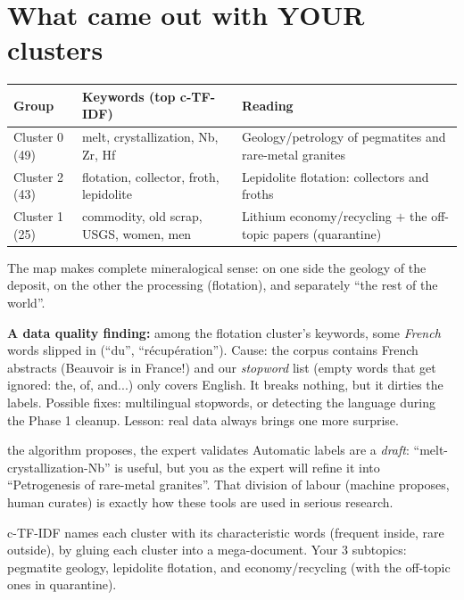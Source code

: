 \documentclass[11pt,a4paper]{article}
\begin{document}
\section{What came out with YOUR clusters}

\begin{center}
\begin{tabular}{lp{5.2cm}p{5.2cm}}
\textbf{Group} & \textbf{Keywords (top c-TF-IDF)} & \textbf{Reading} \\
\hline
Cluster 0 (49) & melt, crystallization, Nb, Zr, Hf & Geology/petrology of pegmatites and
rare-metal granites \\
Cluster 2 (43) & flotation, collector, froth, lepidolite & Lepidolite flotation:
collectors and froths \\
Cluster 1 (25) & commodity, old scrap, USGS, women, men & Lithium economy/recycling $+$ the
off-topic papers (quarantine) \\
\end{tabular}
\end{center}

The map makes complete mineralogical sense: on one side the geology of the deposit, on the
other the processing (flotation), and separately ``the rest of the world''.

\begin{ojo}
\textbf{A data quality finding:} among the flotation cluster's keywords, some \emph{French}
words slipped in (``du'', ``récupération''). Cause: the corpus contains French abstracts
(Beauvoir is in France!) and our \emph{stopword} list (empty words that get ignored: the, of,
and...) only covers English. It breaks nothing, but it dirties the labels. Possible fixes:
multilingual stopwords, or detecting the language during the Phase 1 cleanup. Lesson: real
data always brings one more surprise.
\end{ojo}

\begin{concepto}{the algorithm proposes, the expert validates}
Automatic labels are a \emph{draft}: ``melt-crystallization-Nb'' is useful, but you as the
expert will refine it into ``Petrogenesis of rare-metal granites''. That division of labour
(machine proposes, human curates) is exactly how these tools are used in serious research.
\end{concepto}

\begin{resumen}
c-TF-IDF names each cluster with its characteristic words (frequent inside, rare outside), by
gluing each cluster into a mega-document. Your 3 subtopics: pegmatite geology, lepidolite
flotation, and economy/recycling (with the off-topic ones in quarantine).
\end{resumen}
\clearpage
{}
{}
\end{document}
